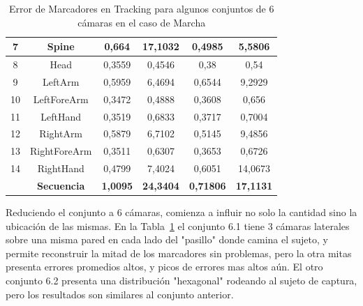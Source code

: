 \begin{table}[h]
{\begin{tabular}{c|c|c|c|c|c|}
\multicolumn{1}{|c|}{7} & Spine & 0,664 & 17,1032 & 0,4985 & 5,5806 \\ \hline
\multicolumn{1}{|c|}{8} & Head & 0,3559 & 0,4546 & 0,38 & 0,54 \\ \hline
\multicolumn{1}{|c|}{9} & LeftArm & 0,5959 & 6,4694 & 0,6544 & 9,2929 \\ \hline
\multicolumn{1}{|c|}{10} & LeftForeArm & 0,3472 & 0,4888 & 0,3608 & 0,656 \\ \hline
\multicolumn{1}{|c|}{11} & LeftHand & 0,3519 & 0,6833 & 0,3717 & 0,7004 \\ \hline
\multicolumn{1}{|c|}{12} & RightArm & 0,5879 & 6,7102 & 0,5145 & 9,4856 \\ \hline
\multicolumn{1}{|c|}{13} & RightForeArm & 0,3511 & 0,6307 & 0,3653 & 0,6726 \\ \hline
\multicolumn{1}{|c|}{14} & RightHand & 0,4799 & 7,4024 & 0,6051 & 14,0673 \\ \hline
 & \textbf{Secuencia} & \textbf{1,0095} & \textbf{24,3404} & \textbf{0,71806} & \textbf{17,1131} \\ \cline{2-6} 
\end{tabular}
}
\caption{Error de Marcadores en Tracking para algunos conjuntos de 6 cámaras en el caso de Marcha}
\label{error_captura_marcha_61_62_camaras}
\end{table}

Reduciendo el conjunto a 6 cámaras, comienza a influir no solo la cantidad sino la ubicación de las mismas. En la Tabla~\ref{error_captura_marcha_61_62_camaras} el conjunto 6.1 tiene 3 cámaras laterales sobre una misma pared en cada lado del "pasillo" donde camina el sujeto, y permite reconstruir la mitad de los marcadores sin problemas, pero la otra mitas presenta errores promedios altos, y picos de errores mas altos aún. El otro conjunto 6.2 presenta una distribución "hexagonal" rodeando al sujeto de captura, pero los resultados son similares al conjunto anterior.

